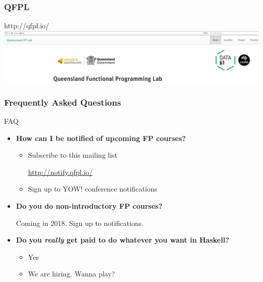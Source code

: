 \begin{frame}
\frametitle{QFPL}
\begin{block}{http://qfpl.io/}
\includegraphics[height=0.24\textheight]{image/qfpl-io.png}
\end{block}
\end{frame}

\begin{frame}
\frametitle{Frequently Asked Questions}
\begin{block}{FAQ}
\begin{itemize}
\item<1-> \textbf{How can I be notified of upcoming FP courses?}
  \begin{itemize}
  \item Subscribe to this mailing list

        \url{http://notify.qfpl.io/}
  \item Sign up to YOW! conference notifications
  \end{itemize}
\item<2-> \textbf{Do you do non-introductory FP courses?}

  Coming in 2018. Sign up to notifications.
\item<3-> \textbf{Do you \emph{really} get paid to do whatever you want in Haskell?}
  \begin{itemize}
  \item<3-> Yes
  \item<4-> We are hiring. Wanna play?
  \end{itemize}
\end{itemize}
\end{block}
\end{frame}
